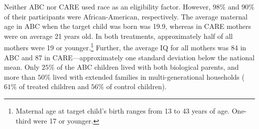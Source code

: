 

\noindent Neither ABC nor CARE used race as an eligibility factor. However, $98\%$ and $90\%$ of their participants were African-American, respectively. The average maternal age in ABC when the target child was born was 19.9, whereas in CARE mothers were on average 21 years old. In both treatments, approximately half of all mothers were 19 or younger.\footnote{Maternal age at target child's birth ranges from 13 to 43 years of age. One-third were 17 or younger.} Further, the average IQ for all mothers was 84 in ABC and 87 in CARE---approximately one standard deviation below the national mean. Only $25\%$ of the ABC children lived with both biological parents, and more than $50\%$ lived with extended families in multi-generational households ($61\%$ of treated children and $56\%$ of control children).\\

